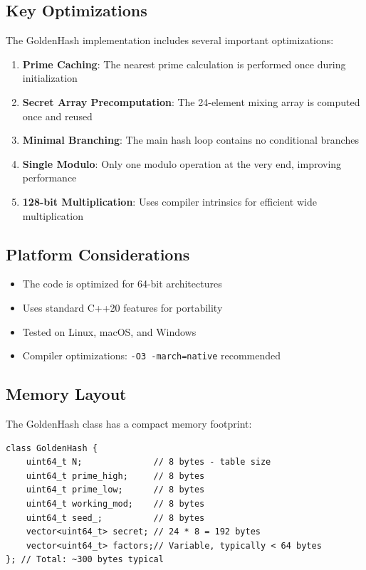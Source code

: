 \documentclass[11pt,a4paper]{article}
\theoremstyle{definition}
\begin{document}
\subsection{Key Optimizations}

The GoldenHash implementation includes several important optimizations:

\begin{enumerate}
\item \textbf{Prime Caching}: The nearest prime calculation is performed once during initialization
\item \textbf{Secret Array Precomputation}: The 24-element mixing array is computed once and reused
\item \textbf{Minimal Branching}: The main hash loop contains no conditional branches
\item \textbf{Single Modulo}: Only one modulo operation at the very end, improving performance
\item \textbf{128-bit Multiplication}: Uses compiler intrinsics for efficient wide multiplication
\end{enumerate}

\subsection{Platform Considerations}

\begin{itemize}
\item The code is optimized for 64-bit architectures
\item Uses standard C++20 features for portability
\item Tested on Linux, macOS, and Windows
\item Compiler optimizations: \texttt{-O3 -march=native} recommended
\end{itemize}

\subsection{Memory Layout}

The GoldenHash class has a compact memory footprint:
\begin{verbatim}
class GoldenHash {
    uint64_t N;              // 8 bytes - table size
    uint64_t prime_high;     // 8 bytes
    uint64_t prime_low;      // 8 bytes 
    uint64_t working_mod;    // 8 bytes
    uint64_t seed_;          // 8 bytes
    vector<uint64_t> secret; // 24 * 8 = 192 bytes
    vector<uint64_t> factors;// Variable, typically < 64 bytes
}; // Total: ~300 bytes typical
\end{verbatim}
\end{document}
